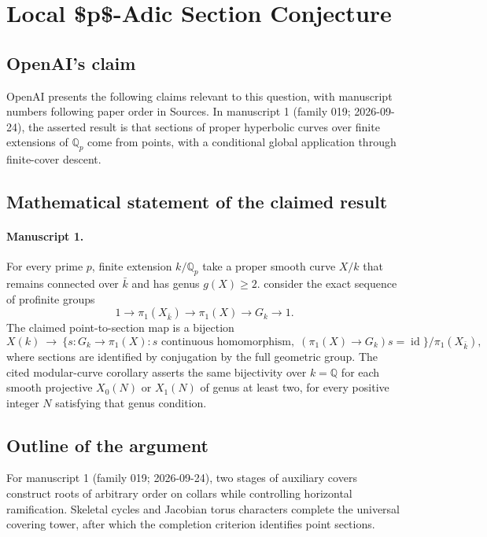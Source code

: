\documentclass[11pt]{article}
\begin{document}
\section*{Local \$p\$-Adic Section Conjecture}

\subsection{OpenAI's claim}
OpenAI presents the following claims relevant to this question, with manuscript numbers following paper order in Sources. In manuscript 1 (family 019; 2026-09-24), the asserted result is that sections of proper hyperbolic curves over finite extensions of $\mathbb Q_p$ come from points, with a conditional global application through finite-cover descent.

\subsection{Mathematical statement of the claimed result}
\paragraph{Manuscript 1.}
For every prime $p$, finite extension $k/\mathbb Q_p$ take a proper smooth curve $X/k$ that remains connected over $\bar k$ and has genus $g(X)\ge2$. consider the exact sequence of profinite groups
\[
 1\longrightarrow\pi_1(X_{\bar k})\longrightarrow\pi_1(X)
 \longrightarrow G_k\longrightarrow1.
\]
The claimed point-to-section map is a bijection
\[
 X(k)\ \longrightarrow\
 \{s:G_k\to\pi_1(X):s\text{ continuous homomorphism},\;
             (\pi_1(X)\to G_k)s=\operatorname{id}\}/\pi_1(X_{\bar k}),
\]
where sections are identified by conjugation by the full geometric group. The cited modular-curve corollary asserts the same bijectivity over $k=\mathbb Q$ for each smooth projective $X_0(N)$ or $X_1(N)$ of genus at least two, for every positive integer $N$ satisfying that genus condition.

\subsection{Outline of the argument}
For manuscript 1 (family 019; 2026-09-24), two stages of auxiliary covers construct roots of arbitrary order on collars while controlling horizontal ramification. Skeletal cycles and Jacobian torus characters complete the universal covering tower, after which the completion criterion identifies point sections.
\end{document}
